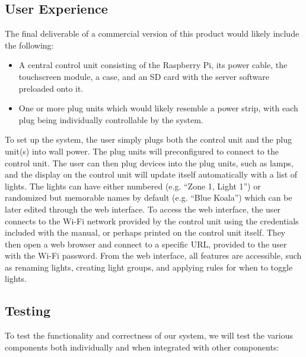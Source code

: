 \subsection{User Experience}

The final deliverable of a commercial version of this product would likely
include the following:

\begin{itemize}
    \item A central control unit consisting of the Raspberry Pi, its power
        cable, the touchscreen module, a case, and an SD card with the server
        software preloaded onto it.
    \item One or more plug units which would likely resemble a power strip,
        with each plug being individually controllable by the system.
\end{itemize}

To set up the system, the user simply plugs both the control unit and the plug
unit(s) into wall power.  The plug units will preconfigured to connect to the
control unit.  The user can then plug devices into the plug units, such as
lamps, and the display on the control unit will update itself automatically
with a list of lights.  The lights can have either numbered (e.g. ``Zone 1,
Light 1'') or randomized but memorable names by default (e.g. ``Blue Koala'')
which can be later edited through the web interface.  To access the web
interface, the user connects to the Wi-Fi network provided by the control unit
using the credentials included with the manual, or perhaps printed on the
control unit itself.  They then open a web browser and connect to a specific
URL, provided to the user with the Wi-Fi password.  From the web interface, all
features are accessible, such as renaming lights, creating light groups, and
applying rules for when to toggle lights.

\subsection{Testing}

To test the functionality and correctness of our system, we will test the
various components both individually and when integrated with other components:

